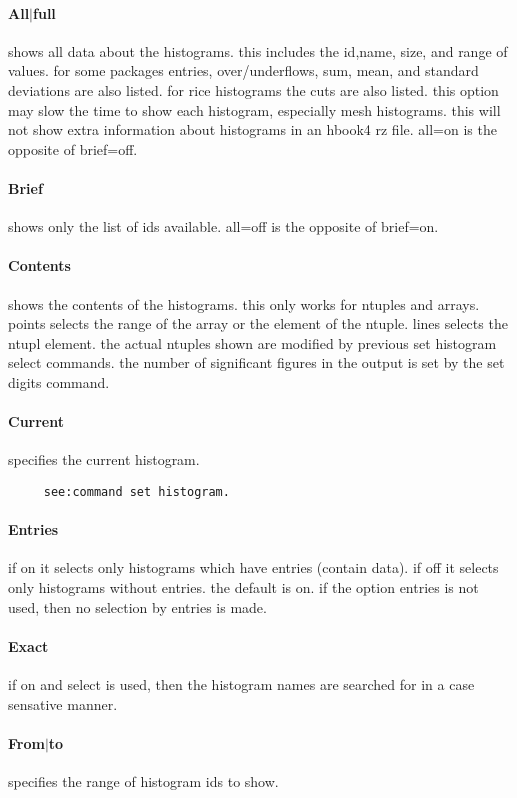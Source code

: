 \paragraph{All$|$full}
shows  all  data  about  the  histograms.  this includes the id,name,
size,  and   range   of   values.    for   some   packages   entries,
over/underflows,  sum, mean, and standard deviations are also listed.
for rice histograms the cuts are also listed.  this option  may  slow
the  time  to  show each histogram, especially mesh histograms.  this
will not show extra information about  histograms  in  an  hbook4  rz
file.  all=on is the opposite of brief=off.  
\paragraph{Brief}
shows  only  the  list  of ids available.  all=off is the opposite of
brief=on.  
\paragraph{Contents}
shows  the  contents  of the histograms.  this only works for ntuples
and arrays.  points selects the range of the array or the element  of
the  ntuple.   lines  selects  the ntupl element.  the actual ntuples
shown are modified by previous set histogram  select  commands.   the
number  of significant figures in the output is set by the set digits
command.  
\paragraph{Current}
specifies the current histogram.  
\begin{verbatim}
     see:command set histogram.  
\end{verbatim}
\paragraph{Entries}
if  on  it selects only histograms which have entries (contain data).
if off it selects only histograms without entries.   the  default  is
on.   if the option entries is not used, then no selection by entries
is made.  
\paragraph{Exact}
if  on  and select is used, then the histogram names are searched for
in a case sensative manner.  
\paragraph{From$|$to}
specifies the range of histogram ids to show.  

